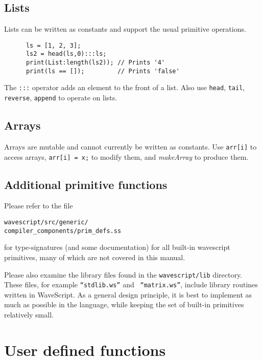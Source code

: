 \documentclass[twocolumn]{report}
\begin{document}
\subsection{Lists}

Lists can be written as constants and support the usual primitive
operations.  
\begin{verbatim}
      ls = [1, 2, 3];
      ls2 = head(ls,0):::ls;
      print(List:length(ls2)); // Prints '4'
      print(ls == []);         // Prints 'false'
\end{verbatim}

The {\tt :::} operator adds an element to the front of a list.  Also
use {\tt head}, {\tt tail}, {\tt reverse}, {\tt append} to operate on
lists. 

\subsection{Arrays}

Arrays are mutable and cannot currently be written as constants.  Use
{\tt arr[i]} to access arrays, {\tt arr[i] = x;} to modify them, and
{\em makeArray} to produce them.

\subsection{Additional primitive functions}

Please refer to the file 
\vspace{-2mm}
\begin{center}
{\tt{wavescript/src/generic/\\compiler\_components/prim\_defs.ss}}
\end{center}
%
for type-signatures (and some documentation) for all built-in
wavescript primitives, many of which are not covered in this manual.

Please also examine the library files found in the {\tt wavescript/lib}
directory.  These files, for example {\tt ``stdlib.ws''} and {\tt
  ``matrix.ws''}, include library routines written in WaveScript.  As
a general design principle, it is best to implement as much as
possible in the language, while keeping the set of built-in primitives
relatively small.


\section{User defined functions}
\end{document}
